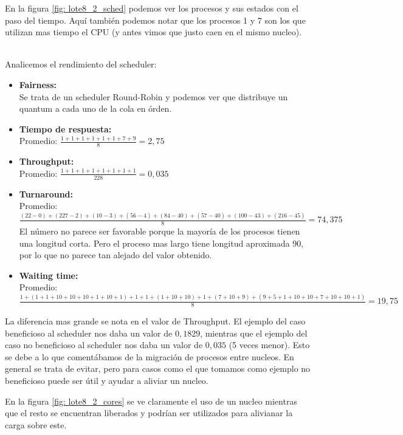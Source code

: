 \par En la figura \ref{fig: lote8_2_sched} podemos ver los procesos y sus estados con el paso del tiempo. Aquí también podemos notar que los procesos 1 y 7 son los que utilizan mas tiempo el CPU (y antes vimos que justo caen en el mismo nucleo). \\\\

\par Analicemos el rendimiento del scheduler:
\begin{itemize}
	\item \textbf{Fairness:} \\
	Se trata de un scheduler Round-Robin y podemos ver que distribuye un quantum a cada uno de la cola en órden.
	\item \textbf{Tiempo de respuesta:}\\
	Promedio: $\frac{1 + 1 + 1 + 1 + 1 + 1 + 7 + 9}{8} = 2,75$
	\item \textbf{Throughput:}\\
	Promedio: $\frac{1 + 1 + 1 + 1 + 1 + 1 + 1 + 1}{228} = 0,035$
	\item \textbf{Turnaround:}\\
	Promedio: $\frac{(22 - 0) + (227 - 2) + (10 - 3) + (56 - 4) + (84 - 40) + (57 - 40) + (100 - 43) + (216 - 45)}{8} = 74,375$ \\
	El número no parece ser favorable porque la mayoría de los procesos tienen una longitud corta. Pero el proceso mas largo tiene longitud aproximada 90, por lo que no parece tan alejado del valor obtenido.
	\item \textbf{Waiting time:}\\
	Promedio: $\frac{1 + (1 + 1 + 10 + 10 + 10 + 1 + 10 + 1) + 1 + 1 + (1 + 10 + 10) + 1 + (7 + 10 + 9) + (9 + 5 + 1 + 10 + 10 + 7 + 10 + 10 + 1)}{8} = 19,75$
\end{itemize}

\par La diferencia mas grande se nota en el valor de Throughput. El ejemplo del caso beneficioso al scheduler nos daba un valor de $0,1829$, mientras que el ejemplo del caso no beneficioso al scheduler nos daba un valor de $0,035$ (5 veces menor). Esto se debe a lo que comentábamos de la migración de procesos entre nucleos. En general se trata de evitar, pero para casos como el que tomamos como ejemplo no beneficioso puede ser útil y ayudar a aliviar un nucleo.
\par En la figura \ref{fig: lote8_2_cores} se ve claramente el uso de un nucleo mientras que el resto se encuentran liberados y podrían ser utilizados para alivianar la carga sobre este.